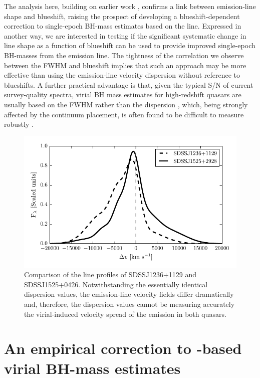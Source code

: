 The analysis here, building on earlier work \citep[including][]{shen12, sulentic07}, confirms a link between  emission-line shape and blueshift, raising the prospect of developing a blueshift-dependent correction to single-epoch BH-mass estimates based on the  line. 
Expressed in another way, we are interested in testing if the significant systematic change in line shape as a function of  blueshift can be used to provide improved single-epoch BH-masses from the  emission line.  
The tightness of the correlation we observe between the  FWHM and blueshift implies that such an approach may be more effective than using the  emission-line velocity dispersion without reference to blueshifts.
A further practical advantage is that, given the typical S/N of current survey-quality spectra, virial BH mass estimates for high-redshift quasars are usually based on the FWHM rather than the dispersion \citep[e.g.][]{shen11}, which, being strongly affected by the continuum placement, is often found to be difficult to measure robustly \citep[e.g.][]{mejia-restrepo16}. 

\begin{figure}
    \includegraphics[width=\linewidth]{figures/chapter02/civ_comparison.pdf} 
    \caption{Comparison of the  line profiles of SDSSJ1236+1129 and SDSSJ1525+0426. Notwithstanding the essentially identical dispersion values, the emission-line velocity fields differ dramatically and, therefore, the dispersion values cannot be measuring accurately the virial-induced velocity spread of the  emission in both quasars. }
    \label{fig:civ_comparison}
\end{figure}

\section{An empirical correction to -based virial BH-mass estimates}

